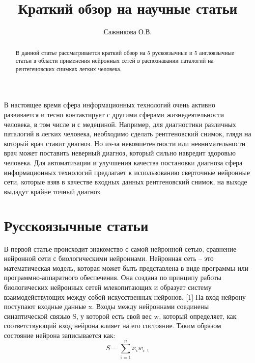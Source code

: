 \documentclass{svproc}
\begin{document}
\mainmatter              %
%
\title{Краткий обзор на научные статьи}
%
\author{Сажникова О.В.}
%
%
%
\maketitle              %

\begin{abstract}
В данной статье рассматривается краткий обзор на 5 рускоязычные и 5 англоязычные статьи в области применения нейронных сетей в распознавании паталогий на рентегеновских снимках легких человека.
% 
\end{abstract}
%
В настоящее время сфера информационных технологий очень активно развивается и тесно контактирует с другими сферами жизнедеятельности человека, в том числе и с медециной. Например, для диагностики различных паталогий в легких человека, необходимо сделать рентгеновский снимок, глядя на который врач ставит диагноз. Но из-за некомпетентности или невнимательности врач может поставить неверный диагноз, который сильно навредит здоровью человека. Для автоматизации и улучшения качества постановки диагноза сфера информационных технологий предлагает к использованию сверточные нейронные сети, которые взяв в качестве входных данных рентгеновский снимок, на выходе выдадут крайне точный диагноз.

\section{Русскоязычные статьи}
%
В первой статье происходит знакомство с самой нейронной сетью, сравнение нейронной сети с биологическими нейроннами. Нейронная сеть – это математическая модель, которая может быть представлена в виде программы или программно-аппаратного обеспечения. Она создана по принципу работы биологических нейронных сетей млекопитающих и образует систему взаимодействующих между собой искусственных нейронов. [1] На вход нейрону поступают входные данные x. Входы между нейроннами соединены синаптической связью S, у которой есть свой вес w, который определяет, как соответствующий вход нейрона влияет на его состояние. Таким образом состояние нейрона записывается как: 
\begin{equation}
  S = \sum\limits_{i=1}^n x_{i} w_{i}\ ,
\end{equation}
\end{document}
